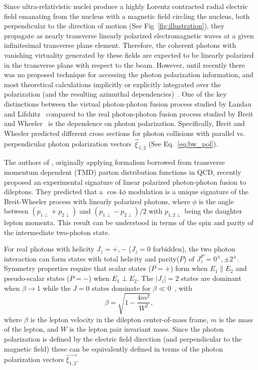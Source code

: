 \documentclass[twocolumn,epjc3]{svjour3}\sloppy
\begin{document}
Since ultra-relativistic nuclei produce a highly Lorentz contracted radial electric field emanating from the nucleus with a magnetic field circling the nucleus, both perpendicular to the direction of motion (See Fig~\ref{fig:illustration}), they propagate as nearly transverse linearly polarized electromagnetic waves at a given infinitesimal transverse plane element. 
Therefore, the coherent photons with vanishing virtuality generated by these fields are expected to be linearly polarized in the transverse plane with respect to the beam. 
However, until recently there was no proposed technique for accessing the photon polarization information, and most theoretical calculations implicitly or explicitly integrated over the polarization (and the resulting azimuthal dependencies)~\cite{SuperChic3}. 
One of the key distinctions between the virtual photon-photon fusion process studied by Landau and Lifshitz~\cite{landauCreationElectronsPositrons1934} compared to the real photon-photon fusion process studied by Breit and Wheeler~\cite{breitCollisionTwoLight1934} is the dependence on photon polarization.
Specifically, Breit and Wheeler predicted different cross sections for photon collisions with parallel vs. perpendicular photon polarization vectors $\vec{\xi}_{1,2}$ (See Eq.~\ref{eq:bw_pol}). 

The authors of \cite{liProbingLinearPolarization2019}, originally applying formalism borrowed from transverse momentum dependent (TMD) parton distribution functions in QCD, recently proposed an experimental signature of linear polarized photon-photon fusion to dileptons.
They predicted that a $\cos4\phi$ modulation is a unique signature of the Breit-Wheeler process with linearly polarized photons, where $\phi$ is the angle between $(p_{1\perp} + p_{2\perp})$ and $(p_{1\perp} - p_{2\perp})/2$ with $p_{1,2\perp}$ being the daughter lepton momenta.  
This result can be understood in terms of the spin and parity of the intermediate two-photon state.

For real photons with helicity $J_z=+,-$ ($J_z=0$ forbidden), the two photon interaction can form states with total helicity and parity($P$) of $J_z^P = 0^\pm, \pm2^\pm$. 
Symmetry properties require that scalar states ($P=+$) form when $E_1 \parallel E_2$ and pseudo-scalar states ($P=-$) when $E_1 \perp E_2$. The $|J_z|=2$ states are dominant when $\beta \rightarrow 1$ while the $J=0$ states dominate for $\beta \ll 0$~\cite{klusek-gawendaCentralityDependenceDilepton2021}, with 
\begin{equation}
    \beta = \sqrt{1 - \frac{4m^2}{W^2}},
\end{equation}
where $\beta$ is the lepton velocity in the dilepton center-of-mass frame, $m$ is the mass of the lepton, and $W$ is the lepton pair invariant mass.
Since the photon polarization is defined by the electric field direction (and perpendicular to the magnetic field) these can be equivalently defined in terms of the photon polarization vectors $\vec{\xi_{1,2}}$.
\end{document}
